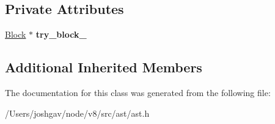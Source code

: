 \subsection*{Private Attributes}
\begin{DoxyCompactItemize}
\item 
\hyperlink{classv8_1_1internal_1_1_block}{Block} $\ast$ {\bfseries try\+\_\+block\+\_\+}\hypertarget{classv8_1_1internal_1_1_try_statement_a85960855b9c72aea93c53b5ea8936cc7}{}\label{classv8_1_1internal_1_1_try_statement_a85960855b9c72aea93c53b5ea8936cc7}

\end{DoxyCompactItemize}
\subsection*{Additional Inherited Members}


The documentation for this class was generated from the following file\+:\begin{DoxyCompactItemize}
\item 
/\+Users/joshgav/node/v8/src/ast/ast.\+h\end{DoxyCompactItemize}
